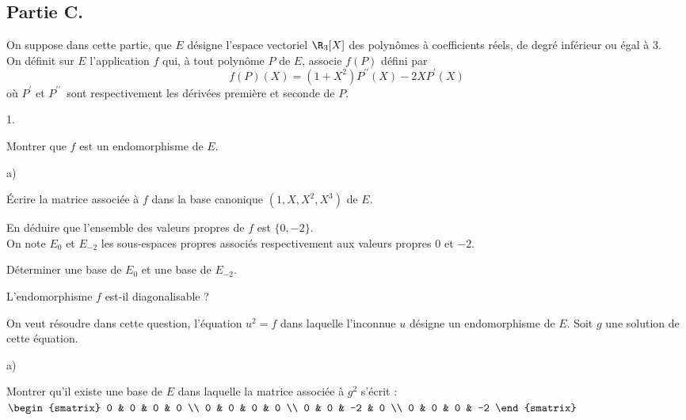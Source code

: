 \documentclass[11pt]{article}%
\begin{document}
\subsection*{Partie C. }

On suppose dans cette partie, que $E$ désigne l'espace vectoriel
$\R_{3}[X]$ des polynômes à coefficients réels, de degré inférieur ou
égal à 3.\\
On définit sur $E$ l'application $f$ qui, à tout polynôme $P$ de $E$,
associe
$f(P)$ défini par 
\[
f(P)(X) = (1 + X^{2})P^{\prime \prime }(X)-2XP^{\prime }(X)
\]
où $P^{\prime }$ et $P^{\prime \prime }$\ sont respectivement les
dérivées
première et seconde de $P$.

\begin{noliste}{1.}
 \setlength{\itemsep}{4mm}
\item Montrer que $f$ est un endomorphisme de $E$.

\item 

\begin{noliste}{a)}
 \setlength{\itemsep}{2mm}
\item Écrire la matrice associée à $f$ dans la base canonique
$(1,X,X^{2},X^{3})$ de $E$.

\item En déduire que l'ensemble des valeurs propres de $f$ est
$\{0,-2\}$.\\
On note $E_{0}$ et $E_{-2}$ les sous-espaces propres associés
respectivement
aux valeurs propres $0$ et $-2$.

\item Déterminer une base de $E_{0}$ et une base de $E_{-2}$.

\item L'endomorphisme $f$ est-il diagonalisable ?
\end{noliste}

\item On veut résoudre dans cette question, l'équation $u^{2} = f$ dans
laquelle l'inconnue $u$ désigne un endomorphisme de $E$. Soit $g$ une
solution de cette équation.

\begin{noliste}{a)}
 \setlength{\itemsep}{2mm}
\item Montrer qu'il existe une base de $E$ dans laquelle la matrice
associée 
à $g^{2}$ s'écrit : $\begin{smatrix}
0 & 0 & 0 & 0 \\
0 & 0 & 0 & 0 \\
0 & 0 & -2 & 0 \\
0 & 0 & 0 & -2
\end{smatrix}
$


\end{noliste}
\end{noliste}
\end{document}
